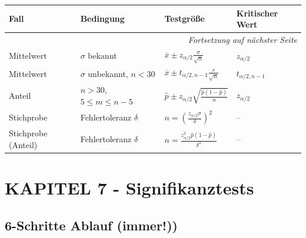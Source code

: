 \documentclass[10pt, a4paper, ngerman]{scrartcl}
\begin{document}
\begin{longtable}{|m{2.5cm}|m{2.5cm}|m{3.5cm}|m{4cm}|}
  \hline
  \textbf{Fall} & \textbf{Bedingung} & \textbf{Testgröße} & \textbf{Kritischer Wert} \\
  \hline
  \endhead
  
  \hline
  \multicolumn{4}{r}{\textit{Fortsetzung auf nächster Seite}} \\
  \endfoot
  
  Mittelwert & $\sigma$ bekannt & $\overline{x} \pm z_{\alpha/2} \frac{\sigma}{\sqrt{n}}$ & $z_{\alpha/2}$ \\
  \hline
  Mittelwert & $\sigma$ unbekannt, $n < 30$ & $\overline{x} \pm t_{\alpha/2,n-1} \frac{s}{\sqrt{n}}$ & $t_{\alpha/2,n-1}$ \\
  \hline
  Anteil & $n > 30$, $5 \leq m \leq n-5$ & $\hat{p} \pm z_{\alpha/2}\sqrt{\frac{\hat{p}(1-\hat{p})}{n}}$ & $z_{\alpha/2}$ \\
  \hline
  Stichprobe & Fehlertoleranz $\delta$ & $n = \left(\frac{z_{\alpha/2} \sigma}{\delta}\right)^2$ & -- \\
  \hline
  Stichprobe (Anteil) & Fehlertoleranz $\delta$ & $n = \frac{z_{\alpha/2}^2 \hat{p}(1-\hat{p})}{\delta^2}$ & -- \\
  \hline
\end{longtable}

\section{KAPITEL 7 - Signifikanztests}

\subsection{6-Schritte Ablauf (immer!))}
\end{document}
